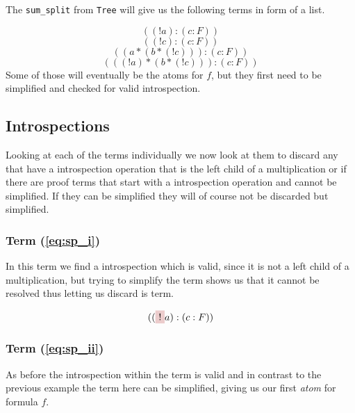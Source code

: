 

The \texttt{sum\_split} from \texttt{Tree} will give us the following terms in form of a list. 

\begin{equation}\label{eq:sp_i}	
	((!a):(c:F))
\end{equation}
\begin{equation}\label{eq:sp_ii}	
	((!c):(c:F))
\end{equation}	
\begin{equation}\label{eq:sp_iii}	
	((a *(b* (! c))):(c:F))											
\end{equation}
\begin{equation}\label{eq:sp_iv}	
	(((! a)*(b* (! c))):(c:F))												
\end{equation}
Some of those will eventually be the atoms for $f$, but they first need to be simplified and checked for valid introspection.

\subsection{Introspections}
Looking at each of the terms individually we now look at them to discard any that have a introspection operation that is the left child of a multiplication or if there are proof terms that start with a introspection operation and cannot be simplified. If they can be simplified they will of course not be discarded but simplified.

\subsubsection[First term]{Term (\ref{eq:sp_i})}
In this term we find a introspection which is valid, since it is not a left child of a multiplication, but trying to simplify the term shows us that it cannot be resolved thus letting us discard is term.

\begin{equation*}
	((\tikz[baseline]{\node[fill=red!20,anchor=base] (t1){$!$};}a):(c:F)) 
\end{equation*}

\subsubsection[Second term]{Term (\ref{eq:sp_ii})}
As before the introspection within the term is valid and in contrast to the previous example the term here can be simplified, giving us our first \emph{atom} for formula $f.$


